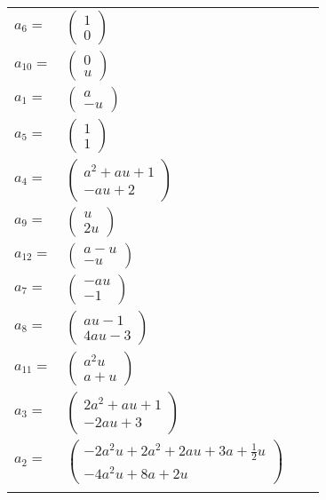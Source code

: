 \documentclass[1p]{elsarticle_modified}
\theoremstyle{definition}
\begin{document}
\begin{tabular}{m{7pt} m{180pt} m{7pt} m{180pt} }
\flushright $a_{6}=$&$\begin{pmatrix}1\\0\end{pmatrix}$ \\
\flushright $a_{10}=$&$\begin{pmatrix}0\\u\end{pmatrix}$ \\
\flushright $a_{1}=$&$\begin{pmatrix}a\\- u\end{pmatrix}$ \\
\flushright $a_{5}=$&$\begin{pmatrix}1\\1\end{pmatrix}$ \\
\flushright $a_{4}=$&$\begin{pmatrix}a^2+a u+1\\- a u+2\end{pmatrix}$ \\
\flushright $a_{9}=$&$\begin{pmatrix}u\\2 u\end{pmatrix}$ \\
\flushright $a_{12}=$&$\begin{pmatrix}a- u\\- u\end{pmatrix}$ \\
\flushright $a_{7}=$&$\begin{pmatrix}- a u\\-1\end{pmatrix}$ \\
\flushright $a_{8}=$&$\begin{pmatrix}a u-1\\4 a u-3\end{pmatrix}$ \\
\flushright $a_{11}=$&$\begin{pmatrix}a^2 u\\a+u\end{pmatrix}$ \\
\flushright $a_{3}=$&$\begin{pmatrix}2 a^2+a u+1\\-2 a u+3\end{pmatrix}$ \\
\flushright $a_{2}=$&$\begin{pmatrix}-2 a^2 u+2 a^2+2 a u+3 a+\frac{1}{2} u\\-4 a^2 u+8 a+2 u\end{pmatrix}$\\&\end{tabular}
\end{document}
